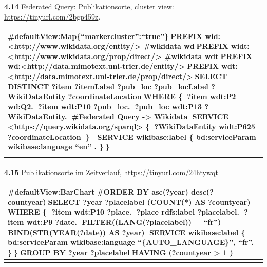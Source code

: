 \documentclass[
  12pt,
  letterpaper,
  DIV=11,
  numbers=noendperiod]{scrreprt}
\makeatletter
\let\oldparagraph\paragraph
\renewcommand{\paragraph}{
    \@ifstar
      \xxxParagraphStar
      \xxxParagraphNoStar
  }
\newcommand{\xxxParagraphStar}[1]{\oldparagraph*{#1}\mbox{}}
\newcommand{\xxxParagraphNoStar}[1]{\oldparagraph{#1}\mbox{}}
\makeatother
\begin{document}
\textbf{4.14} Federated Query: Publikationsorte, cluster view:
\url{https://tinyurl.com/2bgp459z}.

\begin{longtable}[]{@{}
  >{\raggedright\arraybackslash}p{}@{}}
\toprule\noalign{}
\begin{minipage}[b]{\linewidth}\raggedright
\#defaultView:Map\{``markercluster'':``true''\}PREFIX wid:
\textless http://www.wikidata.org/entity/\textgreater{} \#wikidata
wdPREFIX widt:
\textless http://www.wikidata.org/prop/direct/\textgreater{} \#wikidata
wdtPREFIX
wd:\textless http://data.mimotext.uni-trier.de/entity/\textgreater{}PREFIX
wdt:\textless http://data.mimotext.uni-trier.de/prop/direct/\textgreater{}SELECT
DISTINCT ?item ?itemLabel ?pub\_loc ?pub\_locLabel ?WikiDataEntity
?coordinateLocationWHERE \{ ?item wdt:P2 wd:Q2. ?item wdt:P10 ?pub\_loc.
?pub\_loc wdt:P13 ?WikiDataEntity. \#Federated Query -\textgreater{}
Wikidata SERVICE
\textless https://query.wikidata.org/sparql\textgreater{} \{
?WikiDataEntity widt:P625 ?coordinateLocation \}  SERVICE wikibase:label
\{ bd:serviceParam wikibase:language ``en'' . \}\}
\end{minipage} \\
\midrule\noalign{}
\endhead
\bottomrule\noalign{}
\endlastfoot
\end{longtable}

\paragraph{}\label{section-7}

\paragraph{\texorpdfstring{\textbf{4.15} Publikationsorte im
Zeitverlauf,
\url{https://tinyurl.com/24htywqt}}{4.15 Publikationsorte im Zeitverlauf, https://tinyurl.com/24htywqt}}\label{publikationsorte-im-zeitverlauf-httpstinyurl.com24htywqt}

\begin{longtable}[]{@{}
  >{\raggedright\arraybackslash}p{}@{}}
\toprule\noalign{}
\begin{minipage}[b]{\linewidth}\raggedright
\#defaultView:BarChart\#ORDER BY asc(?year) desc(?countyear)SELECT ?year
?placelabel (COUNT(*) AS ?countyear) WHERE \{ ?item wdt:P10 ?place.
?place rdfs:label ?placelabel. ?item wdt:P9 ?date.
FILTER((LANG(?placelabel)) = ``fr'') BIND(STR(YEAR(?date)) AS ?year)
SERVICE wikibase:label \{ bd:serviceParam wikibase:language
``\{AUTO\_LANGUAGE\}'', ``fr''. \}\}GROUP BY ?year ?placelabelHAVING
(?countyear \textgreater{} 1 )
\end{minipage} \\
\midrule\noalign{}
\endhead
\bottomrule\noalign{}
\endlastfoot
\end{longtable}
\end{document}
